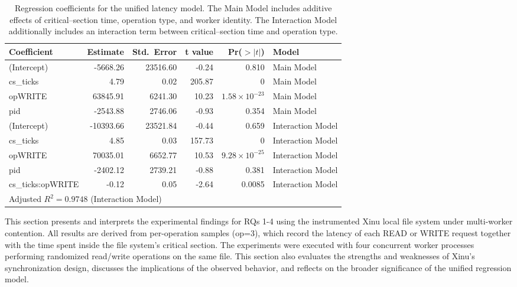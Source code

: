 \documentclass[sigconf]{acmart}
\begin{document}
\begin{table}[t]
\centering
\begin{tabular}{lrrrrl}
\toprule
Coefficient & Estimate & Std.\ Error & t value & Pr($>|t|$) & Model \\
\midrule
(Intercept)              & -5668.26   & 23516.60 &  -0.24 & 0.810 & Main Model \\
cs\_ticks                &     4.79   &     0.02 & 205.87 & 0     & Main Model \\
opWRITE                  & 63845.91   &  6241.30 &  10.23 & $1.58\times10^{-23}$ & Main Model \\
pid                      & -2543.88   &  2746.06 &  -0.93 & 0.354 & Main Model \\
\midrule
(Intercept)              & -10393.66  & 23521.84 &  -0.44 & 0.659 & Interaction Model \\
cs\_ticks                &     4.85   &     0.03 & 157.73 & 0     & Interaction Model \\
opWRITE                  & 70035.01   &  6652.77 &  10.53 & $9.28\times10^{-25}$ & Interaction Model \\
pid                      & -2402.12   &  2739.21 &  -0.88 & 0.381 & Interaction Model \\
cs\_ticks:opWRITE        &    -0.12   &     0.05 &  -2.64 & 0.0085 & Interaction Model \\
\midrule
\multicolumn{6}{l}{Adjusted $R^{2}=0.9748$ (Interaction Model)} \\
\bottomrule
\end{tabular}
\caption{Regression coefficients for the unified latency model. The Main Model includes additive effects of critical--section time, operation type, and worker identity. The Interaction Model additionally includes an interaction term between critical--section time and operation type.}
\label{tab:regression}
\end{table}

This section presents and interprets the experimental findings for RQs 1-4 using the instrumented Xinu local file system under multi-worker contention. All results are derived from per-operation samples (op=3), which record the latency of each READ or WRITE request together with the time spent inside the file system’s critical section. The experiments were executed with four concurrent worker processes performing randomized read/write operations on the same file. This section also evaluates the strengths and weaknesses of Xinu’s synchronization design, discusses the implications of the observed behavior, and reflects on the broader significance of the unified regression model.
\end{document}
